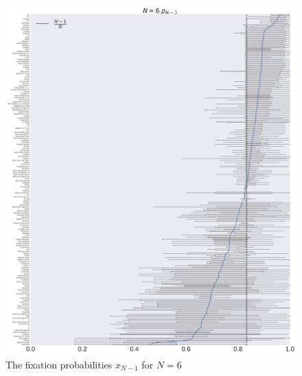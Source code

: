 \documentclass[10pt,letterpaper]{article}
\begin{document}
\begin{figure}[!hbtp]
    \centering
    \includegraphics[width=\textwidth]{./boxplot_6_resist.pdf}
    \caption{The fixation probabilities \(x_{N-1}\) for \(N=6\)}
\end{figure}
\end{document}
